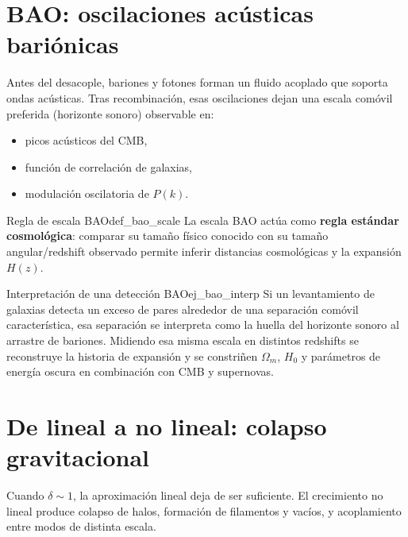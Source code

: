 \section{BAO: oscilaciones acústicas bariónicas}
\label{sec:bao}

Antes del desacople, bariones y fotones forman un fluido acoplado que soporta ondas acústicas. Tras recombinación, esas oscilaciones dejan una escala comóvil preferida (horizonte sonoro) observable en:
\begin{itemize}[leftmargin=2em]
  \item picos acústicos del CMB,
  \item función de correlación de galaxias,
  \item modulación oscilatoria de $P(k)$.
\end{itemize}

\begin{definicion}{Regla de escala BAO}{def_bao_scale}
La escala BAO actúa como \textbf{regla estándar cosmológica}: comparar su tamaño físico conocido con su tamaño angular/redshift observado permite inferir distancias cosmológicas y la expansión $H(z)$.
\end{definicion}

\begin{ejemplo}{Interpretación de una detección BAO}{ej_bao_interp}
Si un levantamiento de galaxias detecta un exceso de pares alrededor de una separación comóvil característica, esa separación se interpreta como la huella del horizonte sonoro al arrastre de bariones. Midiendo esa misma escala en distintos redshifts se reconstruye la historia de expansión y se constriñen $\Omega_m$, $H_0$ y parámetros de energía oscura en combinación con CMB y supernovas.
\end{ejemplo}

\section{De lineal a no lineal: colapso gravitacional}
\label{sec:no_lineal_colapso}

Cuando $\delta\sim1$, la aproximación lineal deja de ser suficiente. El crecimiento no lineal produce colapso de halos, formación de filamentos y vacíos, y acoplamiento entre modos de distinta escala.

